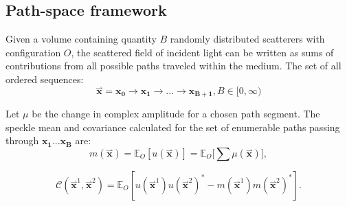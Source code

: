 \subsection{Path-space framework}
Given a volume containing quantity $B$ randomly distributed scatterers with configuration $O$, the scattered field of incident light can be written as sums of contributions from all possible paths traveled within the medium. The set of all ordered sequences:
%
\begin{equation} 
    \overset{\rightharpoonup}{\mathbf{x}} = \mathbf{x_0} \rightarrow \mathbf{x_1} \rightarrow ... \rightarrow \mathbf{x_{B+1}}, B \in [0, \infty)
\end{equation}

Let $\mu$ be the change in complex amplitude for a chosen path segment. The speckle mean and covariance calculated for the set of enumerable paths passing through $\mathbf{x_1}...\mathbf{x_B}$ are:
%
\begin{equation}
    m(\overset{\rightharpoonup}{\mathbf{x}}) = \mathbb{E}_O[ u(\overset{\rightharpoonup}{\mathbf{x}}) ] = \mathbb{E}_O \bigg[ \sum \mu(\overset{\rightharpoonup}{\mathbf{x}}) \bigg],
\end{equation}

\begin{equation}
    \mathcal{C}(\overset{\rightharpoonup}{\mathbf{x}}^1,\overset{\rightharpoonup}{\mathbf{x}}^2) = \mathbb{E}_O[ u(\overset{\rightharpoonup}{\mathbf{x}}^1) u(\overset{\rightharpoonup}{\mathbf{x}}^2)^*  - m(\overset{\rightharpoonup}{\mathbf{x}}^1) m(\overset{\rightharpoonup}{\mathbf{x}}^2)^*].
\end{equation}




